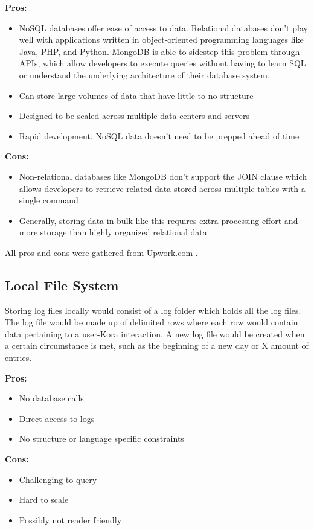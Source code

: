 \documentclass[onecolumn, draftclsnofoot,10pt, compsoc]{IEEEtran}
\begin{document}
			\textbf{Pros:}
				\begin{itemize}
					\item{
						NoSQL databases offer ease of access to data.
						Relational databases don't play well with applications written in object-oriented programming languages like Java, PHP, and Python. 
						MongoDB is able to sidestep this problem through APIs, which allow developers to execute queries without having to learn SQL or understand the underlying architecture of their database system.}
					\item{
						Can store large volumes of data that have little to no structure} 
					\item{
						Designed to be scaled across multiple data centers and servers}
					\item{ 
						Rapid development. NoSQL data doesn’t need to be prepped ahead of time}
				\end{itemize}
			
			\textbf{Cons:}
				\begin{itemize}
					\item{ 
						Non-relational databases like MongoDB don't support the JOIN clause which allows developers to retrieve related data stored across multiple tables with a single command}
					\item{
						Generally, storing data in bulk like this requires extra processing effort and more storage than highly organized relational data}
				\end{itemize}
			All pros and cons were gathered from Upwork.com \cite{SQLvsNoSQLupwork}.
			
		\subsection{Local File System}
			Storing log files locally would consist of a log folder which holds all the log files.
			The log file would be made up of delimited rows where each row would contain data pertaining to a user-Kora interaction.
			A new log file would be created when a certain circumstance is met, such as the beginning of a new day or X amount of entries.
			
			\textbf{Pros:}
				\begin{itemize}
					\item{
						No database calls}
					\item{
						Direct access to logs}
					\item{
						No structure or language specific constraints}
				\end{itemize}
			\textbf{Cons:}
				\begin{itemize}
					\item{
						Challenging to query}
					\item{
						Hard to scale}
					\item{
						Possibly not reader friendly}
				\end{itemize}
\end{document}
